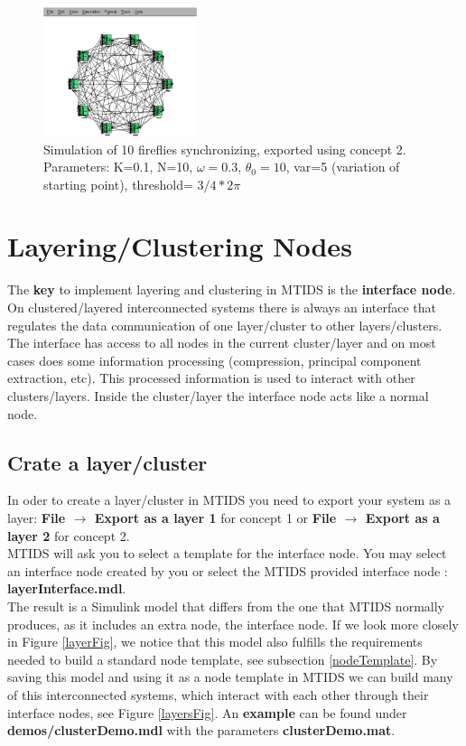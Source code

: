 \documentclass[a4paper,twoside, openright,12pt]{report}
\begin{document}
\begin{figure}[htb]
\centering
\includegraphics[width=0.4\textwidth]{pics/screenfireflies.eps}
\caption[MTIDS fireflies synchronization]{Simulation of 10 fireflies synchronizing, exported using concept 2. Parameters: K=0.1, N=10, $\omega=0.3$, $\theta_0=10$, var=5 (variation of starting point), threshold= $3/4*2\pi$}
\label{syncFig}
\end{figure}



\section{Layering/Clustering Nodes} \label{layering}


The \textbf{key} to implement layering and clustering in MTIDS is the \textbf{interface node}. On clustered/layered interconnected systems there is always an interface
that regulates the data communication of one layer/cluster to other layers/clusters. The interface has access to all nodes in the current cluster/layer and 
on most cases does some information processing (compression, principal component extraction, etc). This processed information is used to interact with 
other clusters/layers. Inside the cluster/layer the interface node acts like a normal node.
\\

\subsection{Crate a layer/cluster}

In oder to create a layer/cluster in MTIDS you need to export your system as a layer: \textbf{File $\rightarrow$ Export as a layer 1} for concept 1 or
\textbf{File $\rightarrow$ Export as a layer 2} for concept 2.\\

MTIDS will ask you to select a template for the interface node. You may select an interface node created by you or select the MTIDS provided
interface node : \textbf{layerInterface.mdl}.\\
The result is a Simulink model that differs from the one that MTIDS normally produces, as it includes an extra node, the interface node.
If we look more closely in Figure \ref{layerFig}, we notice that this model also fulfills the requirements needed to build a standard node template, see subsection \ref{nodeTemplate}.
By saving this model and using it as a node template in MTIDS we can build many of this interconnected systems, which interact with each other through their 
interface nodes, see Figure \ref{layersFig}. An \textbf{example} can be found under \textbf{demos/clusterDemo.mdl} with the parameters \textbf{clusterDemo.mat}.
\end{document}
